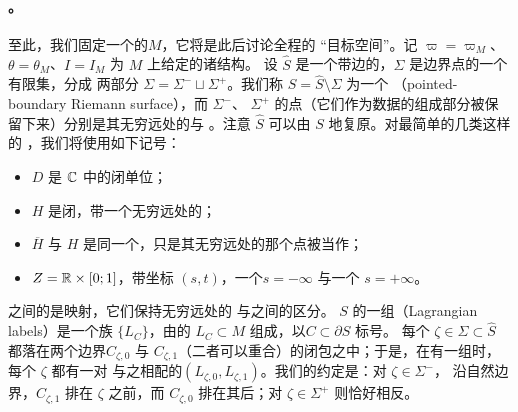 \paragraph{\trRiemann\trSurface。}\label{sub:riemann-surfaces}
至此，我们固定一个\trCorneredBoundary{}的\trExactSymplectic\trManifold{}$M$，它将是此后讨论全程的%
“目标空间”。记 $\varpi=\varpi_M$、$\theta=\theta_M$、$I=I_M$ 为 $M$ 上给定的诸结构。
设 $\widehat{S}$ 是一个带边的\trCompact\trRiemann\trSurface，$\Sigma$ 是边界点的一个有限集，分成
两部分 $\Sigma=\Sigma^-\sqcup\Sigma^+$。我们称 $S=\widehat{S}\setminus\Sigma$ 为一个%
\textbf{\trPointedBoundary\trRiemann\trSurface}（pointed-boundary Riemann surface），而 $\Sigma^-$、
$\Sigma^+$ 的点（它们作为数据的组成部分被保留下来）分别是其无穷远处的\trIncomingPoint{}与%
\trOutgoingPoint。注意 $\widehat{S}$ 可以由 $S$ \trCanonical{}地复原。对最简单的几类这样的%
\trSurface，我们将使用如下记号：
\begin{itemize}
\item $D$ 是 $\mathbb{C}$ 中的闭单位\trDisk；
\item $H$ 是闭\trUpperHalfPlane，带一个无穷远处的\trIncomingPoint；
\item $\overline{H}$ 与 $H$ 是同一个\trSurface，只是其无穷远处的那个点被当作\trOutgoingPoint；
\item $Z=\mathbb{R}\times[0;1]$，带坐标 $(s,t)$，一个\trIncomingPoint{}$s=-\infty$ 与一个%
\trOutgoingPoint{}$s=+\infty$。
\end{itemize}
\trPointedBoundary\trRiemann\trSurface{}之间的\trIsomorphism{}是\trBiholomorphic{}映射，它们保持无穷远处的%
\trIncomingPoint{}与\trOutgoingPoint{}之间的区分。
$S$ 的一组\textbf{\trLagrange\trLabel}（Lagrangian labels）是一个族 $\{L_C\}$，由\trExact{}的%
\trLagrange\trSubmanifold{}$L_C\subset M$ 组成，以\trConnectedComponent{}$C\subset\partial S$ 标号。
每个 $\zeta\in\Sigma\subset\widehat{S}$ 都落在两个边界\trConnectedComponent{}$C_{\zeta,0}$ 与
$C_{\zeta,1}$（二者可以重合）的闭包之中；于是，在有一组\trLagrange\trLabel{}时，每个 $\zeta$ 都有一对
与之相配的\trLagrange\trSubmanifold{}$(L_{\zeta,0},L_{\zeta,1})$。我们的约定是：对 $\zeta\in\Sigma^-$，
沿自然边界\trOrientation，$C_{\zeta,1}$ 排在 $\zeta$ 之前，而 $C_{\zeta,0}$ 排在其后；对
$\zeta\in\Sigma^+$ 则恰好相反。
